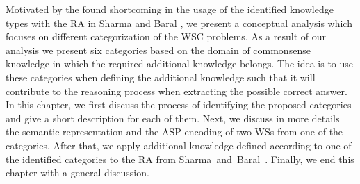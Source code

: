 


Motivated by the found shortcoming in the usage of the identified knowledge types with the RA in Sharma and Baral \cite{2018CommonsenseKT}, we present a conceptual analysis which focuses on different categorization of the WSC problems. As a result of our analysis we present six categories based on the domain of commonsense knowledge in which the required additional knowledge belongs. The idea is to use these categories when defining the additional knowledge such that it will contribute to the reasoning process when extracting the possible correct answer. In this chapter, we first discuss the process of identifying the proposed categories and give a short description for each of them. Next, we discuss in more details the semantic representation and the ASP encoding of two WSs from one of the categories. After that, we apply additional knowledge defined according to one of the identified categories to the RA from Sharma~and~Baral~\cite{2018CommonsenseKT}. Finally, we end this chapter with a general discussion.
  
\begin{comment}
Similarly as in Sharma et al. \cite{DBLP:conf/ijcai/SharmaVAB15} and in Sharma and Baral \cite{2018CommonsenseKT}, we identify categories of knowledge which are needed in order to answer the questions from the WSs. 
The identified categories are based on the domains of commonsense knowledge from which the required knowledge is.  
We identified six categories with which all problems from the WSC corpus were categorized.
We use the KParser for extracting the semantic graph representation of the sentence. Next we are interested into identifying the relevant knowledge which is needed for resolving the ambiguous pronoun. 
We use the KParser for extracting the graph representation of the input sentence and question. Furthermore, we use the Reasoning Algorithm given in \cite{2018CommonsenseKT} for finding the correct answer with some small modification which will be explained later.
\end{comment}


